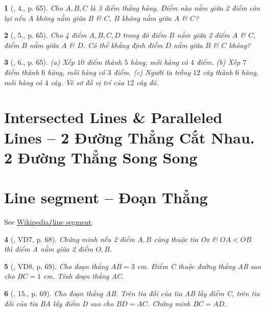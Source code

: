 \documentclass{article}
\newtheorem{baitoan}{}
\begin{document}
\begin{baitoan}[\cite{Binh_Toan_6_tap_2}, 4., p. 65]
	Cho $A,B,C$ là 3 điểm thẳng hàng. Điểm nào nằm giữa 2 điểm còn lại nếu $A$ không nằm giữa $B$ \& $C$, $B$ không nằm giữa $A$ \& $C$?
\end{baitoan}

\begin{baitoan}[\cite{Binh_Toan_6_tap_2}, 5., p. 65]
	Cho 4 điểm $A,B,C,D$ trong đó điểm $B$ nằm giữa 2 điểm $A$ \& $C$, điểm $B$ nằm giữa $A$ \& $D$. Có thể khẳng định điểm $D$ nằm giữa $B$ \& $C$ không?
\end{baitoan}

\begin{baitoan}[\cite{Binh_Toan_6_tap_2}, 6., p. 65]
	(a) Xếp $10$ điểm thành $5$ hàng, mỗi hàng có $4$ điểm. (b) Xếp $7$ điểm thành $6$ hàng, mỗi hàng có $3$ điểm. (c) Người ta trồng $12$ cây thành $6$ hàng, mỗi hàng có $4$ cây. Vẽ sơ đồ vị trí của $12$ cây đó.
\end{baitoan}


\section{Intersected Lines \& Paralleled Lines -- 2 Đường Thẳng Cắt Nhau. 2 Đường Thẳng Song Song}




\section{Line segment -- Đoạn Thẳng}
See \href{https://en.wikipedia.org/wiki/Line_segment}{Wikipedia{\tt/}line segment}.

\begin{baitoan}[\cite{Binh_Toan_6_tap_2}, VD7, p. 68]
	Chứng minh nếu 2 điểm $A,B$ cùng thuộc tia Ox \& $OA < OB$ thì điểm A nằm giữa 2 điểm $O,B$.
\end{baitoan}

\begin{baitoan}[\cite{Binh_Toan_6_tap_2}, VD8, p. 69]
	Cho đoạn thẳng $AB = 3$ {\rm cm}. Điểm C thuộc đường thẳng AB sao cho $BC = 1$ {\rm cm}. Tính  đoạn thẳng AC.
\end{baitoan}

\begin{baitoan}[\cite{Binh_Toan_6_tap_2}, 15., p. 69]
	Cho đoạn thẳng AB. Trên tia đối của tia AB lấy điểm C, trên tia đối của tia BA lấy điểm D sao cho $BD = AC$. Chứng minh $BC = AD$.
\end{baitoan}
\end{document}
